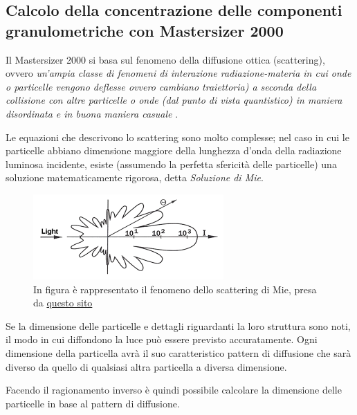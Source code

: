 \documentclass[11pt, a4paper, openright, titlepage, final, language = italian]{book}
\begin{document}
\begin{appendices}
\chapter{Calcolo della concentrazione delle componenti granulometriche con Mastersizer 2000}
Il Mastersizer 2000 si basa sul fenomeno della diffusione ottica (scattering), ovvero
\textit{un'ampia classe di fenomeni di interazione radiazione-materia
  in cui onde o particelle vengono deflesse ovvero cambiano
  traiettoria) a seconda della collisione con altre particelle o onde
  (dal punto di vista quantistico) in maniera disordinata e in buona
  maniera casuale} \citep{scattering}.  

Le equazioni che descrivono lo scattering sono molto complesse; nel
caso in cui le particelle abbiano dimensione maggiore della lunghezza
d'onda della radiazione luminosa incidente, esiste (assumendo la
perfetta sfericit\`a delle particelle) una soluzione matematicamente
rigorosa, detta \textit{Soluzione di Mie}.

\begin{figure}[ht]
  \includegraphics[width=\textwidth]{../foto/Mie_scattering.jpeg}
  \caption{In figura \`e rappresentato il fenomeno dello scattering di Mie, presa da
    \href{http://www.smart-piv.com/en/techniques/mie-rayleigh-raman/index.php}{questo
      sito}
    \label{fig:Mie}}
\end{figure}

Se la dimensione delle particelle e dettagli riguardanti la loro
struttura sono noti, il modo in cui diffondono la luce pu\`o essere
previsto accuratamente. Ogni dimensione della particella avr\`a il suo
caratteristico pattern di diffusione che sar\`a diverso da quello di
qualsiasi altra particella a diversa dimensione.

Facendo il ragionamento inverso \`e quindi possibile calcolare la
dimensione delle particelle in base al pattern di diffusione.


\end{appendices}
\end{document}
